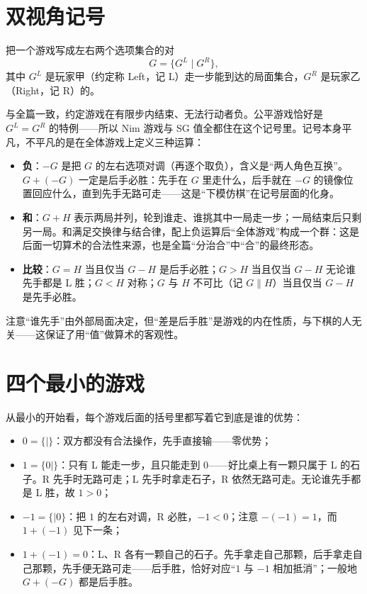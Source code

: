 \section{双视角记号}
\begin{definition}[游戏的双视角记号]
把一个游戏写成左右两个选项集合的对
\[
 G=\{G^L\mid G^R\},
\]
其中 $G^L$ 是玩家甲（约定称 Left，记 L）走一步能到达的局面集合，$G^R$ 是玩家乙（Right，记 R）的。
\end{definition}
与全篇一致，约定游戏在有限步内结束、无法行动者负。公平游戏恰好是 $G^L=G^R$ 的特例——所以 Nim 游戏与 SG 值全都住在这个记号里。记号本身平凡，不平凡的是在全体游戏上定义三种运算：
\begin{itemize}
\item \textbf{负}：$-G$ 是把 $G$ 的左右选项对调（再逐个取负），含义是“两人角色互换”。$G+(-G)$ 一定是后手必胜：先手在 $G$ 里走什么，后手就在 $-G$ 的镜像位置回应什么，直到先手无路可走——这是“下模仿棋”在记号层面的化身。
\item \textbf{和}：$G+H$ 表示两局并列，轮到谁走、谁挑其中一局走一步；一局结束后只剩另一局。和满足交换律与结合律，配上负运算后“全体游戏”构成一个群：这是后面一切算术的合法性来源，也是全篇“分治合”中“合”的最终形态。
\item \textbf{比较}：$G=H$ 当且仅当 $G-H$ 是后手必胜；$G>H$ 当且仅当 $G-H$ 无论谁先手都是 L 胜；$G<H$ 对称；$G$ 与 $H$ 不可比（记 $G\parallel H$）当且仅当 $G-H$ 是先手必胜。
\end{itemize}
注意“谁先手”由外部局面决定，但“差是后手胜”是游戏的内在性质，与下棋的人无关——这保证了用“值”做算术的客观性。

\section{四个最小的游戏}
从最小的开始看，每个游戏后面的括号里都写着它到底是谁的优势：
\begin{itemize}
\item $0=\{\mid\}$：双方都没有合法操作，先手直接输——零优势；
\item $1=\{0\mid\}$：只有 L 能走一步，且只能走到 $0$——好比桌上有一颗只属于 L 的石子。R 先手时无路可走；L 先手时拿走石子，R 依然无路可走。无论谁先手都是 L 胜，故 $1>0$；
\item $-1=\{\mid 0\}$：把 $1$ 的左右对调，R 必胜，$-1<0$；注意 $-(-1)=1$，而 $1+(-1)$ 见下一条；
\item $1+(-1)=0$：L、R 各有一颗自己的石子。先手拿走自己那颗，后手拿走自己那颗，先手便无路可走——后手胜，恰好对应“$1$ 与 $-1$ 相加抵消”；一般地 $G+(-G)$ 都是后手胜。
\end{itemize}

